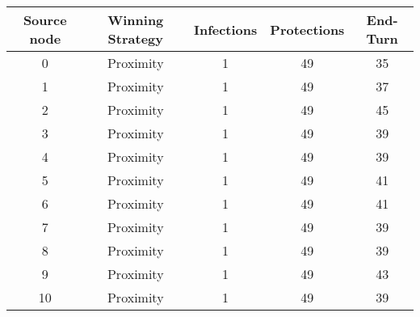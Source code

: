 \documentclass[results.tex]{subfiles}
\begin{document}
    \begin{center}
        \begin{tabular}{| c || c | c | c | c |}
            \hline
            {\bfseries Source node} & {\bfseries Winning Strategy} & {\bfseries Infections} & {\bfseries Protections}
            & {\bfseries End-Turn}
            \\  %
            \hline\hline
            0                       & Proximity                    & 1                      & 49                      & 35                   \\
            \hline
            1                       & Proximity                    & 1                      & 49                      & 37                   \\
            \hline
            2                       & Proximity                    & 1                      & 49                      & 45                   \\
            \hline
            3                       & Proximity                    & 1                      & 49                      & 39                   \\
            \hline
            4                       & Proximity                    & 1                      & 49                      & 39                   \\
            \hline
            5                       & Proximity                    & 1                      & 49                      & 41                   \\
            \hline
            6                       & Proximity                    & 1                      & 49                      & 41                   \\
            \hline
            7                       & Proximity                    & 1                      & 49                      & 39                   \\
            \hline
            8                       & Proximity                    & 1                      & 49                      & 39                   \\
            \hline
            9                       & Proximity                    & 1                      & 49                      & 43                   \\
            \hline
            10                      & Proximity                    & 1                      & 49                      & 39                   \\

\end{tabular}
\end{center}
\end{document}
